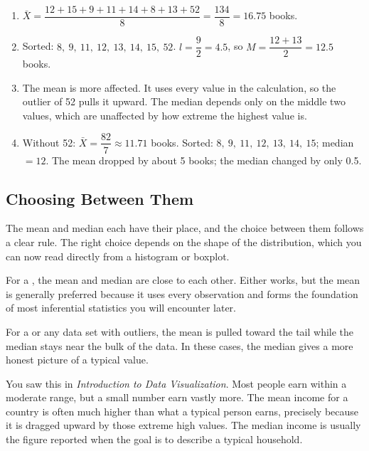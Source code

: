 \begin{Answer}[ref={ex:mean_median}]
\begin{enumerate}
    \item $\bar{X} = \dfrac{12+15+9+11+14+8+13+52}{8} =
    \dfrac{134}{8} = 16.75$ books.
    \item Sorted: $8,\ 9,\ 11,\ 12,\ 13,\ 14,\ 15,\ 52$.
    $l = \dfrac{9}{2} = 4.5$, so $M = \dfrac{12+13}{2} = 12.5$ books.
    \item The mean is more affected. It uses every value in the
    calculation, so the outlier of 52 pulls it upward. The median
    depends only on the middle two values, which are unaffected by
    how extreme the highest value is.
    \item Without 52: $\bar{X} = \dfrac{82}{7} \approx 11.71$ books.
    Sorted: $8,\ 9,\ 11,\ 12,\ 13,\ 14,\ 15$; median $= 12$.
    The mean dropped by about 5 books; the median changed by only 0.5.
\end{enumerate}
\end{Answer}

\subsection{Choosing Between Them}

The mean and median each have their place, and the choice between them
follows a clear rule. The right choice depends on the shape of the distribution, which you can now read directly from a histogram or boxplot.

For a ,
the mean and median are close to each other. Either works, but the
mean is generally preferred because it uses every observation and
forms the foundation of most inferential statistics you will encounter
later.

For a  or any
data set with outliers, the mean is pulled toward the tail while the
median stays near the bulk of the data. In these cases, the median
gives a more honest picture of a typical value.

You saw this in \textit{Introduction to Data Visualization}. Most
people earn within a moderate range, but a small number earn vastly
more. The mean income for a country is often much higher than what a
typical person earns, precisely because it is dragged upward by those
extreme high values. The median income is usually the figure reported
when the goal is to describe a typical household.

